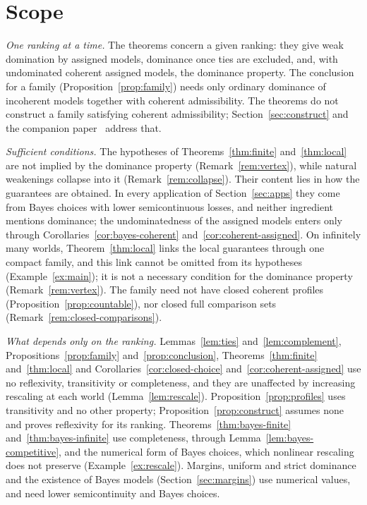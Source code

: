 \documentclass[11pt]{article}
\theoremstyle{definition}
\theoremstyle{remark}
\begin{document}
\section{Scope}\label{sec:scope}
\emph{One ranking at a time.} The theorems concern a given ranking: they give weak domination by assigned models, dominance once ties are excluded, and, with undominated coherent assigned models, the dominance property. The conclusion for a family (Proposition~\ref{prop:family}) needs only ordinary dominance of incoherent models together with coherent admissibility. The theorems do not construct a family satisfying coherent admissibility; Section~\ref{sec:construct} and the companion paper~\cite{KCM} address that.

\emph{Sufficient conditions.} The hypotheses of Theorems~\ref{thm:finite} and~\ref{thm:local} are not implied by the dominance property (Remark~\ref{rem:vertex}), while natural weakenings collapse into it (Remark~\ref{rem:collapse}). Their content lies in how the guarantees are obtained. In every application of Section~\ref{sec:apps} they come from Bayes choices with lower semicontinuous losses, and neither ingredient mentions dominance; the undominatedness of the assigned models enters only through Corollaries~\ref{cor:bayes-coherent} and~\ref{cor:coherent-assigned}. On infinitely many worlds, Theorem~\ref{thm:local} links the local guarantees through one compact family, and this link cannot be omitted from its hypotheses (Example~\ref{ex:main}); it is not a necessary condition for the dominance property (Remark~\ref{rem:vertex}). The family need not have closed coherent profiles (Proposition~\ref{prop:countable}), nor closed full comparison sets (Remark~\ref{rem:closed-comparisons}).

\emph{What depends only on the ranking.} Lemmas~\ref{lem:ties} and~\ref{lem:complement}, Propositions~\ref{prop:family} and~\ref{prop:conclusion}, Theorems~\ref{thm:finite} and~\ref{thm:local} and Corollaries~\ref{cor:closed-choice} and~\ref{cor:coherent-assigned} use no reflexivity, transitivity or completeness, and they are unaffected by increasing rescaling at each world (Lemma~\ref{lem:rescale}). Proposition~\ref{prop:profiles} uses transitivity and no other property; Proposition~\ref{prop:construct} assumes none and proves reflexivity for its ranking. Theorems~\ref{thm:bayes-finite} and~\ref{thm:bayes-infinite} use completeness, through Lemma~\ref{lem:bayes-competitive}, and the numerical form of Bayes choices, which nonlinear rescaling does not preserve (Example~\ref{ex:rescale}). Margins, uniform and strict dominance and the existence of Bayes models (Section~\ref{sec:margins}) use numerical values, and need lower semicontinuity and Bayes choices.
\end{document}
